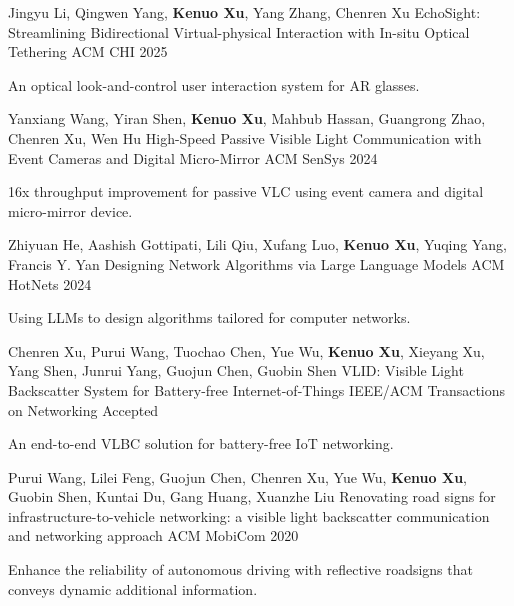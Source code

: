 \documentclass[11pt, a4paper]{awesome-cv}
\begin{document}
\begin{cventries}
	\cventry
	{Jingyu Li, Qingwen Yang, \textbf{Kenuo Xu}, Yang Zhang, Chenren Xu}
	{EchoSight: Streamlining Bidirectional Virtual-physical Interaction with In-situ Optical Tethering}
	{ACM CHI}
	{2025}
	{
		\begin{cvitems} %
			\item {An optical look-and-control user interaction system for AR glasses.}
		\end{cvitems}
	}
	
	\cventry
	{Yanxiang Wang, Yiran Shen, \textbf{Kenuo Xu}, Mahbub Hassan, Guangrong Zhao, Chenren Xu, Wen Hu}
	{High-Speed Passive Visible Light Communication with Event Cameras and Digital Micro-Mirror}
	{ACM SenSys}
	{2024}
	{
		\begin{cvitems} %
			\item {16x throughput improvement for passive VLC using event camera and digital micro-mirror device.}
		\end{cvitems}
	}
	
	\cventry
	{Zhiyuan He, Aashish Gottipati, Lili Qiu, Xufang Luo, \textbf{Kenuo Xu}, Yuqing Yang, Francis Y. Yan}
	{Designing Network Algorithms via Large Language Models}
	{ACM HotNets}
	{2024}
	{
		\begin{cvitems} %
			\item {Using LLMs to design algorithms tailored for computer networks.}
		\end{cvitems}
	}

	\cventry
	{Chenren Xu, Purui Wang, Tuochao Chen, Yue Wu, \textbf{Kenuo Xu}, Xieyang Xu, Yang Shen, Junrui Yang, Guojun Chen, Guobin Shen}
	{VLID: Visible Light Backscatter System for Battery-free Internet-of-Things}
	{IEEE/ACM Transactions on Networking}
	{Accepted}
	{
		\begin{cvitems} %
			\item {An end-to-end VLBC solution for battery-free IoT networking.}
		\end{cvitems}
	}
	
	\cventry
	{Purui Wang, Lilei Feng, Guojun Chen, Chenren Xu, Yue Wu, \textbf{Kenuo Xu}, Guobin Shen, Kuntai Du, Gang Huang, Xuanzhe Liu}
	{Renovating road signs for infrastructure-to-vehicle networking: a visible light backscatter communication and networking approach}
	{ACM MobiCom}
	{2020}
	{
		\begin{cvitems} %
			\item {Enhance the reliability of autonomous driving with reflective roadsigns that conveys dynamic additional information.}
		\end{cvitems}
	}
	

\end{cventries}
\end{document}
